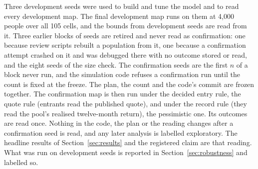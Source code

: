 Three development seeds were used to build and tune the model and to read every development map. The final
development map runs on them at 4,000 people over all 105 cells, and the bounds from development seeds are read from
it. Three earlier blocks of seeds are retired and never read as confirmation: one because review scripts rebuilt
a population from it, one because a confirmation attempt crashed on it and was debugged there with no outcome
stored or read, and the eight seeds of the size check. The confirmation seeds are the first $n$ of a block never run,
and the simulation code refuses a confirmation run until the count is fixed at the freeze. The plan, the count and the code's
commit are frozen together. The confirmation map is then run under the decided entry rule, the quote rule
(entrants read the published quote), and under the record rule (they read the pool's realised twelve-month
return), the pessimistic one. Its outcomes are read once.
Nothing in the code, the plan or the reading changes after a confirmation seed is read, and any later analysis is
labelled exploratory. The headline results of Section~\ref{sec:results} and the registered claim are that
reading. What was run on development seeds is reported in Section~\ref{sec:robustness} and labelled so.
